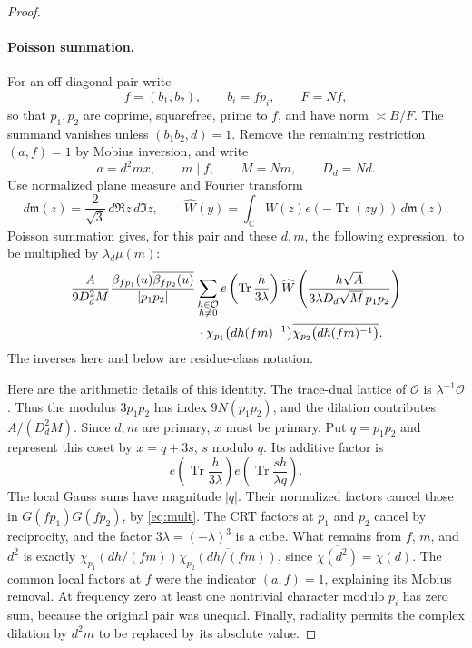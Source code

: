 \begin{proof}
\paragraph{Poisson summation.}
For an off-diagonal pair write
\[
 f=(b_1,b_2),\qquad b_i=fp_i,\qquad F=Nf,
\]
so that $p_1,p_2$ are coprime, squarefree, prime to $f$, and have norm
$\asymp B/F$. The summand vanishes unless $(b_1b_2,d)=1$. Remove the
remaining restriction $(a,f)=1$ by Mobius inversion, and write
\[
 a=d^2mx,\qquad m\mid f,\qquad M=Nm,\qquad D_d=Nd.
\]
Use normalized plane measure and Fourier transform
\[
 d\mathfrak m(z)=\frac2{\sqrt3}\,d\Re z\,d\Im z,
 \qquad
 \widehat W(y)=\int_{\mathbb C}W(z)e(-\operatorname{Tr}(zy))
                                      \,d\mathfrak m(z).
\]
Poisson summation gives, for this pair and these $d,m$, the following
expression, to be multiplied by $\lambda_d\mu(m)$:
\begin{equation}
\begin{split}
 &\frac{A}{9D_d^2M}
  \frac{\beta_{fp_1}(u)\overline{\beta_{fp_2}(u)}}{|p_1p_2|}
  \sum_{\substack{h\in\mathcal O\\h\ne0}}
  e\left(\operatorname{Tr}\frac{h}{3\lambda}\right)
  \widehat W\left(
    \frac{h\sqrt A}{3\lambda D_d\sqrt M\,p_1p_2}\right)\\
 &\hspace{35mm}\cdot
  \chi_{p_1}\bigl(dh(fm)^{-1}\bigr)
  \overline{\chi_{p_2}\bigl(dh(fm)^{-1}\bigr)}.
\end{split}
\label{eq:poisson}
\end{equation}
The inverses here and below are residue-class notation.

Here are the arithmetic details of this identity. The trace-dual lattice
of $\mathcal O$ is $\lambda^{-1}\mathcal O$. Thus the modulus
$3p_1p_2$ has index $9N(p_1p_2)$, and the dilation contributes
$A/(D_d^2M)$. Since $d,m$ are primary, $x$ must be primary. Put
$q=p_1p_2$ and represent this coset by $x=q+3s$, $s$ modulo $q$.
Its additive factor is
\[
 e\left(\operatorname{Tr}\frac{h}{3\lambda}\right)
 e\left(\operatorname{Tr}\frac{sh}{\lambda q}\right).
\]
The local Gauss sums have magnitude $|q|$. Their normalized factors
cancel those in $G(fp_1)\overline{G(fp_2)}$, by \eqref{eq:mult}.
The CRT factors at $p_1$ and $p_2$ cancel by reciprocity, and the factor
$3\lambda=(-\lambda)^3$ is a cube. What remains from $f$, $m$, and
$d^2$ is exactly
$\chi_{p_1}(dh/(fm))\overline{\chi_{p_2}(dh/(fm))}$, since
$\overline{\chi(d^2)}=\chi(d)$. The common local factors at $f$ were
the indicator $(a,f)=1$, explaining its Mobius removal. At frequency
zero at least one nontrivial character modulo $p_i$ has zero sum,
because the original pair was unequal. Finally, radiality permits the
complex dilation by $d^2m$ to be replaced by its absolute value.


\end{proof}

